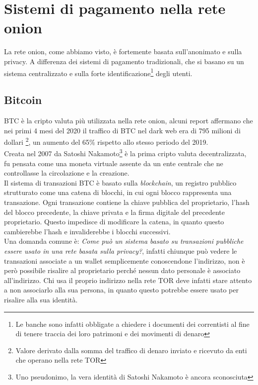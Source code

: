\chapter{Sistemi di pagamento nella rete onion}
\label{cap:sistemi_di_pagamento}
La rete onion, come abbiamo visto, è fortemente basata sull'anonimato e sulla privacy. 
A differenza dei sistemi di pagamento tradizionali, che si basano su un sistema centralizzato e sulla forte identificazione\footnote{Le banche sono infatti obbligate a chiedere i documenti dei correntisti al fine di tenere traccia dei loro patrimoni e dei movimenti di denaro} degli utenti. 

\section{Bitcoin}
\label{sec:bitcoin}
BTC è la cripto valuta più utilizzata nella rete onion, alcuni report \cite{BTCdarkWeb} affermano che nei primi 4 mesi del 2020 il traffico di BTC nel dark web era di 795 milioni di dollari \footnote{Valore derivato dalla somma del traffico di denaro inviato e ricevuto da enti che operano nella rete TOR}, un aumento del 65\% rispetto allo stesso periodo del 2019.\\
Creata nel 2007 da Satoshi Nakamoto\footnote{Uno pseudonimo, la vera identità di Satoshi Nakamoto è ancora sconosciuta} è la prima cripto valuta decentralizzata, fu pensata come una moneta virtuale assente da un ente centrale che ne controllasse la circolazione e la creazione.\\
Il sistema di transazioni BTC è basato sulla \textit{blockchain}, un registro pubblico strutturato come una catena di blocchi, in cui ogni blocco rappresenta una transazione.
Ogni transazione contiene la chiave pubblica del proprietario, l'hash del blocco precedente, la chiave privata e la firma digitale del precedente proprietario. 
Questo impedisce di modificare la catena, in quanto questo cambierebbe l'hash e invaliderebbe i blocchi successivi.\\
Una domanda comune è: \textit{Come può un sistema basato su transazioni pubbliche essere usato in una rete basata sulla privacy?}, infatti chiunque può vedere le transazioni associate a un wallet semplicemente conoscendone l'indirizzo, non è però possibile risalire al proprietario perché nessun dato personale è associato all'indirizzo. 
Chi usa il proprio indirizzo nella rete TOR deve infatti stare attento a non associarlo alla sua persona, in quanto questo potrebbe essere usato per risalire alla sua identità. \cite{BTCcashSystem}

